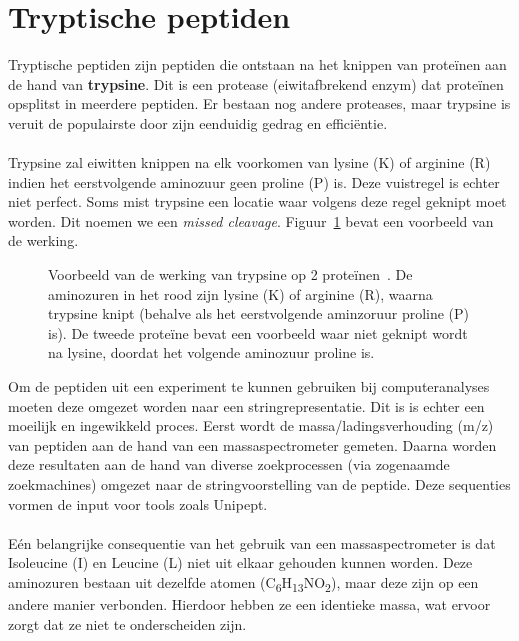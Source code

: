\section{Tryptische peptiden}\label{sec:tryptische-peptiden}
Tryptische peptiden zijn peptiden die ontstaan na het knippen van proteïnen aan de hand van \textbf{trypsine}.
Dit is een protease (eiwitafbrekend enzym) dat proteïnen opsplitst in meerdere peptiden.
Er bestaan nog andere proteases, maar trypsine is veruit de populairste door zijn eenduidig gedrag en efficiëntie.
\\ \\
Trypsine zal eiwitten knippen na elk voorkomen van lysine (K) of arginine (R) indien het eerstvolgende aminozuur geen proline (P) is.
Deze vuistregel is echter niet perfect.
Soms mist trypsine een locatie waar volgens deze regel geknipt moet worden.
Dit noemen we een \textit{missed cleavage}.
Figuur~\ref{fig:trypsine} bevat een voorbeeld van de werking.

\begin{figure}[H]
    \centering
    
    \caption{Voorbeeld van de werking van trypsine op 2 proteïnen~\cite{phdPieterUnipept}. De aminozuren in het rood zijn lysine (K) of arginine (R), waarna trypsine knipt (behalve als het eerstvolgende aminzoruur proline (P) is). De tweede proteïne bevat een voorbeeld waar niet geknipt wordt na lysine, doordat het volgende aminozuur proline is.}
    \label{fig:trypsine}
\end{figure}

Om de peptiden uit een experiment te kunnen gebruiken bij computeranalyses moeten deze omgezet worden naar een stringrepresentatie.
Dit is is echter een moeilijk en ingewikkeld proces.
Eerst wordt de massa/ladingsverhouding (m/z) van peptiden aan de hand van een massaspectrometer gemeten.
Daarna worden deze resultaten aan de hand van diverse zoekprocessen (via zogenaamde zoekmachines) omgezet naar de stringvoorstelling van de peptide.
Deze sequenties vormen de input voor tools zoals Unipept.
\\ \\
Eén belangrijke consequentie van het gebruik van een massaspectrometer is dat Isoleucine (I) en Leucine (L) niet uit elkaar gehouden kunnen worden.
Deze aminozuren bestaan uit dezelfde atomen (C\textsubscript{6}H\textsubscript{13}NO\textsubscript{2}), maar deze zijn op een andere manier verbonden.
Hierdoor hebben ze een identieke massa, wat ervoor zorgt dat ze niet te onderscheiden zijn.


